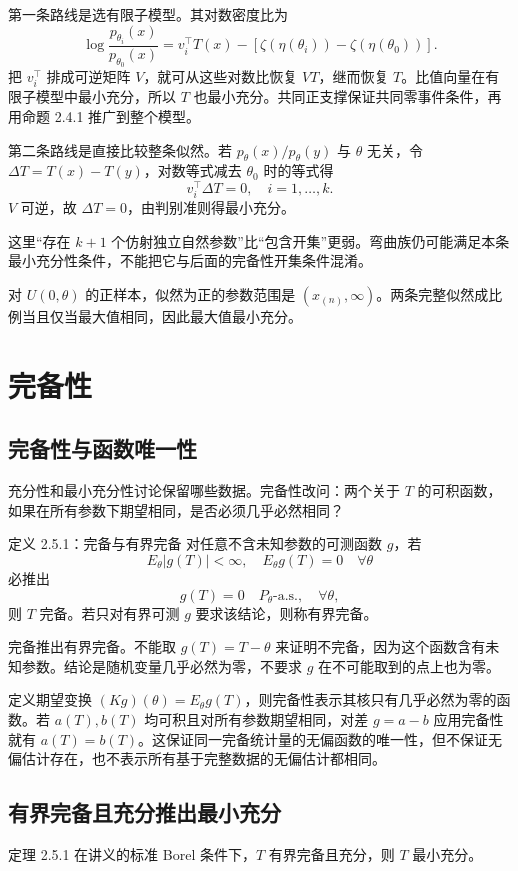 第一条路线是选有限子模型。其对数密度比为
\[
 \log\frac{p_{\theta_i}(x)}{p_{\theta_0}(x)}
 =v_i^\top T(x)-[\zeta(\eta(\theta_i))-\zeta(\eta(\theta_0))].
\]
把 $v_i^\top$ 排成可逆矩阵 $V$，就可从这些对数比恢复 $VT$，继而恢复 $T$。比值向量在有限子模型中最小充分，所以 $T$ 也最小充分。共同正支撑保证共同零事件条件，再用命题 2.4.1 推广到整个模型。

第二条路线是直接比较整条似然。若 $p_\theta(x)/p_\theta(y)$ 与 $\theta$ 无关，令 $\Delta T=T(x)-T(y)$，对数等式减去 $\theta_0$ 时的等式得
\[
 v_i^\top\Delta T=0,\quad i=1,\ldots,k.
\]
$V$ 可逆，故 $\Delta T=0$，由判别准则得最小充分。

这里“存在 $k+1$ 个仿射独立自然参数”比“包含开集”更弱。弯曲族仍可能满足本条最小充分性条件，不能把它与后面的完备性开集条件混淆。

对 $U(0,\theta)$ 的正样本，似然为正的参数范围是 $(x_{(n)},\infty)$。两条完整似然成比例当且仅当最大值相同，因此最大值最小充分。

\section{完备性}

\subsection{完备性与函数唯一性}
充分性和最小充分性讨论保留哪些数据。完备性改问：两个关于 $T$ 的可积函数，如果在所有参数下期望相同，是否必须几乎必然相同？

\begin{definitionbox}{定义 2.5.1：完备与有界完备}
对任意不含未知参数的可测函数 $g$，若
\[
 E_\theta|g(T)|<\infty,\quad E_\theta g(T)=0\quad\forall\theta
\]
必推出
\[
 g(T)=0\quad P_\theta\text{-a.s.},\quad\forall\theta,
\]
则 $T$ 完备。若只对有界可测 $g$ 要求该结论，则称有界完备。
\end{definitionbox}

完备推出有界完备。不能取 $g(T)=T-\theta$ 来证明不完备，因为这个函数含有未知参数。结论是随机变量几乎必然为零，不要求 $g$ 在不可能取到的点上也为零。

定义期望变换 $(Kg)(\theta)=E_\theta g(T)$，则完备性表示其核只有几乎必然为零的函数。若 $a(T),b(T)$ 均可积且对所有参数期望相同，对差 $g=a-b$ 应用完备性就有 $a(T)=b(T)$。这保证同一完备统计量的无偏函数的唯一性，但不保证无偏估计存在，也不表示所有基于完整数据的无偏估计都相同。

\subsection{有界完备且充分推出最小充分}
\begin{definitionbox}{定理 2.5.1}
在讲义的标准 Borel 条件下，$T$ 有界完备且充分，则 $T$ 最小充分。
\end{definitionbox}

